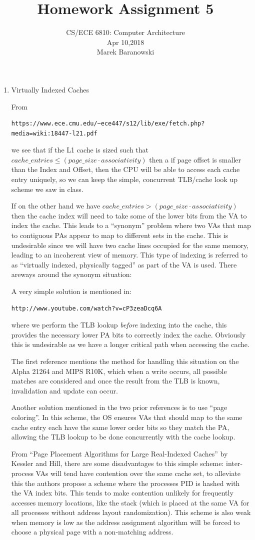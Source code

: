 \documentclass[a4paper, 11pt]{exam}
\title{Homework Assignment 5}
\subtitle{CS/ECE 6810: Computer Architecture \\
Apr 10,2018\\
Marek Baranowski}
\begin{document}
\maketitle
\begin{enumerate}
\item Virtually Indexed Caches

From 
\begin{verbatim}
https://www.ece.cmu.edu/~ece447/s12/lib/exe/fetch.php?media=wiki:18447-l21.pdf
\end{verbatim}
we see that if the L1 cache is sized such that 
$cache\_entries\le(page\_size\cdot associativity)$ then a if page offset is smaller
than the Index and Offset, then the CPU will be able to access each cache
entry uniquely, so we can keep the simple, concurrent TLB/cache look up scheme
we saw in class.

If on the other hand we have $cache\_entries>(page\_size\cdot associativity)$
then the cache index will need to take some of the lower bits from the VA to
index the cache. This leads to a ``synonym'' problem where two VAs that map
to contiguous PAs appear to map to different sets in the cache. This is 
undesirable since we will have two cache lines occupied for the same memory,
leading to an incoherent view of memory. This type of indexing is referred to
as ``virtually indexed, physically tagged'' as part of the VA is used. There 
areways around the synonym situation:

A very simple solution is mentioned in:
\begin{verbatim}http://www.youtube.com/watch?v=cP3zeaDcq6A\end{verbatim}
where we perform the TLB lookup {\em before} indexing into the cache, this
provides the necessary lower PA bits to correctly index the cache. Obviously
this is undesirable as we have a longer critical path when accessing the cache.

The first reference mentions the method for handling this situation on
the Alpha 21264 and MIPS R10K, which when a write occurs, all possible matches
are considered and once the result from the TLB is known, invalidation and
update can occur.


Another solution mentioned in the two prior references is to use ``page
coloring''. In this scheme, the OS ensures VAs that should map to the same 
cache entry each have the same lower order bits so they match the PA, allowing 
the TLB lookup to be done concurrently with the cache lookup. 

From ``Page Placement Algorithms for Large Real-Indexed Caches'' by Kessler and
Hill, there are some disadvantages to this simple scheme: inter-process VAs
will tend have contention over the same cache set, to alleviate this the authors
propose a scheme where the processes PID is hashed with the VA index bits. This
tends to make contention unlikely for frequently accesses memory locations, like
the stack (which is placed at the same VA for all processes without address
layout randomization). This scheme is also weak when memory is low as the 
address assignment algorithm will be forced to choose a physical page with a
non-matching address.


\end{enumerate}
\end{document}
